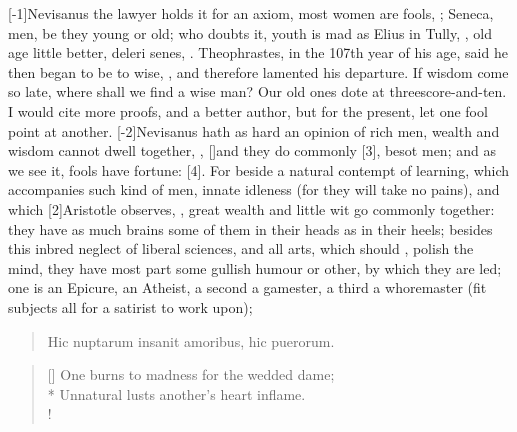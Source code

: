 {[-1\baselineskip]Nevisanus the lawyer holds it for an axiom, most women are fools,
; Seneca, men, be they young or old;
who doubts it, youth is mad as Elius in Tully, ,
old age little better, deleri senes, \etc{}. Theophrastes, in the 107th
year of his age, said he then began to be to wise, , and therefore lamented his departure. If wisdom come so late,
where shall we find a wise man? Our old ones dote at
threescore-and-ten. I would cite more proofs, and a better author, but
for the present, let one fool point at another. [-2\baselineskip]Nevisanus hath as
hard an opinion of rich men, wealth and wisdom cannot dwell
together, , [\baselineskip]and they do commonly
[3\baselineskip], besot men; and as we see it, fools have
fortune: [4\baselineskip]. For
beside a natural contempt of learning, which accompanies such kind of
men, innate idleness (for they will take no pains), and which
[2\baselineskip]Aristotle observes, , great wealth and little wit go
commonly together: they have as much brains some of them in their heads
as in their heels; besides this inbred neglect of liberal sciences, and
all arts, which should , polish the mind, they have most
part some gullish humour or other, by which they are led; one is an
Epicure, an Atheist, a second a gamester, a third a whoremaster (fit
subjects all for a satirist to work upon);

\begin{verse}
\textlatin{Hic nuptarum insanit amoribus, hic puerorum.}
\end{verse}

\settowidth{\versewidth}{One burns to madness for the wedded dame;}
\begin{verse}[\versewidth]
One burns to madness for the wedded dame;\\*
Unnatural lusts another's heart inflame.\\!
\end{verse}

}
